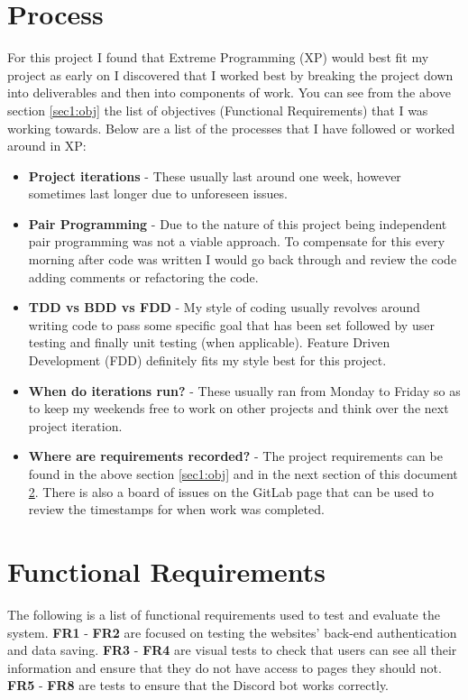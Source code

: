 \section{Process}\label{sec1:pro}
For this project I found that Extreme Programming (XP) would best fit my project as early on I discovered that I worked best by breaking the project down into deliverables and then into components of work. You can see from the above section \ref{sec1:obj} the list of objectives (Functional Requirements) that I was working towards. Below are a list of the processes that I have followed or worked around in XP:
\begin{itemize}
	\item \textbf{Project iterations} - These usually last around one week, however sometimes last longer due to unforeseen issues.
	\item \textbf{Pair Programming} - Due to the nature of this project being independent pair programming was not a viable approach. To compensate for this every morning after code was written I would go back through and review the code adding comments or refactoring the code.
	\item \textbf{TDD vs BDD vs FDD} - My style of coding usually revolves around writing code to pass some specific goal that has been set followed by user testing and finally unit testing (when applicable). Feature Driven Development (FDD) definitely fits my style best for this project.
	\item \textbf{When do iterations run?} - These usually ran from Monday to Friday so as to keep my weekends free to work on other projects and think over the next project iteration.
	\item \textbf{Where are requirements recorded?} - The project requirements can be found in the above section \ref{sec1:obj} and in the next section of this document \ref{sec1:fr}. There is also a board of issues on the GitLab page that can be used to review the timestamps for when work was completed.
\end{itemize}

\section{Functional Requirements}\label{sec1:fr}

The following is a list of functional requirements used to test and evaluate the system. \textbf{FR1} - \textbf{FR2} are focused on testing the websites' back-end authentication and data saving. \textbf{FR3} - \textbf{FR4} are visual tests to check that users can see all their information and ensure that they do not have access to pages they should not. \textbf{FR5} - \textbf{FR8} are tests to ensure that the Discord bot works correctly. 

